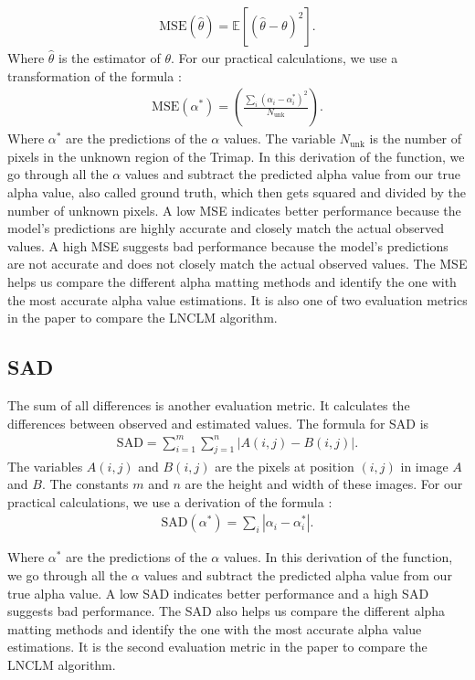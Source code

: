 \begin{align}
	\text{MSE}( \hat{\theta} ) = \mathbb{E}[ ( \hat{\theta} - \theta)^2 ]. 
\end{align}
Where \(\hat{\theta} \) is the estimator of \(\theta\).
For our practical calculations, we use a transformation of the formula \cite{lnclm}: 
\begin{align}
	\text{MSE}(\alpha^*) = \left(  \frac{\sum_i \left( \alpha_i - \alpha^*_i \right)^2}{N_{\text{unk}}}  \right) .
\end{align} 
Where \(\alpha^*\) are the predictions of the \(\alpha\) values. The variable \(N_{\text{unk}}\) is the number of pixels in the unknown region of the Trimap. In this derivation of the function, we go through all the \(\alpha\) values and subtract the predicted alpha value from our true alpha value, also called ground truth, which then gets squared and divided by the number of unknown pixels. A low MSE indicates better performance because the model's predictions are highly accurate and closely match the actual observed values. A high MSE suggests bad performance because the model's predictions are not accurate and does not closely match the actual observed values. The MSE helps us compare the different alpha matting methods and identify the one with the most accurate alpha value estimations. It is also one of two evaluation metrics in the paper \cite{lnclm} to compare the LNCLM algorithm. 

\subsection{SAD}
The sum of all differences is another evaluation metric. It calculates the differences between observed and estimated values. The formula for SAD is
\begin{align}
	\text{SAD} = \sum_{i=1}^m \sum_{j=1}^n |A(i,j) - B(i,j)|. 
\end{align}
The variables \(A(i,j)\) and \(B(i,j)\) are the pixels at position \((i,j)\) in image \(A\) and \(B\). The constants \(m\) and \(n\) are the height and width of these images.  
For our practical calculations, we use a derivation of the formula \cite{lnclm}:
\begin{align}
	\text{SAD}(\alpha^*) = \sum_i |\alpha_i - \alpha^*_i| .
\end{align} 

Where \(\alpha^*\) are the predictions of the \(\alpha\) values. In this derivation of the function, we go through all the \(\alpha\) values and subtract the predicted alpha value from our true alpha value. A low SAD indicates better performance and a high SAD suggests bad performance. The SAD also helps us compare the different alpha matting methods and identify the one with the most accurate alpha value estimations. It is the second evaluation metric in the paper \cite{lnclm} to compare the LNCLM algorithm. 

